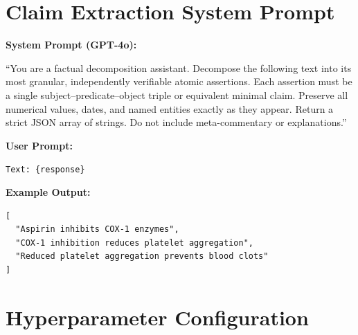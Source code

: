 \documentclass[12pt,a4paper]{report}
\begin{document}
\appendix
\chapter{Claim Extraction System Prompt}

\textbf{System Prompt (GPT-4o):}

``You are a factual decomposition assistant. Decompose the following text into its most granular, independently verifiable atomic assertions. Each assertion must be a single subject--predicate--object triple or equivalent minimal claim. Preserve all numerical values, dates, and named entities exactly as they appear. Return a strict JSON array of strings. Do not include meta-commentary or explanations.''

\textbf{User Prompt:}

\texttt{Text: \{response\}}

\textbf{Example Output:}

\begin{verbatim}
[
  "Aspirin inhibits COX-1 enzymes",
  "COX-1 inhibition reduces platelet aggregation",
  "Reduced platelet aggregation prevents blood clots"
]
\end{verbatim}

\chapter{Hyperparameter Configuration}
\end{document}
